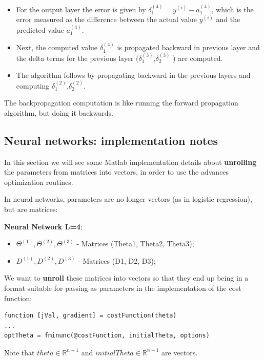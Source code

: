 \begin{itemize}    
\item For the output layer the error is given by $\delta_1^{(4)} = y^{(i)} - a_1^{(4)}$, which is the error measured as the difference between the actual value $y^{(i)}$ and the predicted value $a_1^{(4)}$.
\item Next, the computed value $\delta_1^{(4)}$ is propagated backward in previous layer and  the delta terms for the previous layer ($\delta_1^{(3)}$,$\delta_2^{(3)}$ ) are computed.
\item The algorithm follows by propagating backward in the previous layers and computing $\delta_1^{(2)}$,$\delta_2^{(2)}$.
\end{itemize}    
    
The backpropagation computation is like running the forward propagation algorithm, but doing it backwards.         


\subsection{Neural networks: implementation notes}
In this section we will see some Matlab implementation details about {\bf unrolling} the parameters from matrices into vectors, in order to use the advances optimization routines.

In neural networks, parameters are no longer vectors (as in logistic regression), but are matrices:

{\bf Neural Network L=4}:
\begin{itemize}
\item $\Theta^{(1)}, \Theta^{(2)}, \Theta^{(3)}$ - Matrices (Theta1, Theta2, Theta3);
\item $D^{(1)}, D^{(2)}, D^{(3)}$ - Matrices (D1, D2, D3);
\end{itemize}

We want to {\bf unroll} these matrices into vectors so that they end up being in a format suitable for passing as parameters in the implementation of the cost function:
\begin{mdframed}[style=MyFrame]
\begin{lstlisting}
function [jVal, gradient] = costFunction(theta)
...
optTheta = fminunc(@costFunction, initialTheta, options)  
\end{lstlisting}
\end{mdframed}
Note that $theta \in \mathbb{R}^{n+1}$ and $initialTheta \in \mathbb{R}^{n+1}$ are vectors.


